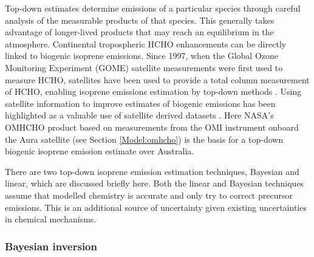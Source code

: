 \documentclass[acp, manuscript]{copernicus}
\newcommand{\parencite}{\citep}
\newcommand{\textcite}{\citet}
\begin{document}
Top-down estimates determine emissions of a particular species through careful analysis of the measurable products of that species.
This generally takes advantage of longer-lived products that may reach an equilibrium in the atmosphere.
Continental tropospheric HCHO enhancements can be directly linked to biogenic isoprene emissions.
Since 1997, when the Global Ozone Monitoring Experiment (GOME) satellite measurements were first used to measure HCHO, satellites have been used to provide a total column measurement of HCHO, enabling isoprene emissions estimation by top-down methods \parencite{Thomas1998,Palmer2001,Bauwens2016}.
Using satellite information to improve estimates of biogenic emissions has been highlighted as a valuable use of satellite derived datasets \parencite{Streets2013}.
Here NASA's OMHCHO product based on measurements from the OMI instrument onboard the Aura satellite (see Section \ref{Model:omhcho}) is the basis for a top-down biogenic isoprene emission estimate over Australia.

There are two top-down isoprene emission estimation techniques, Bayesian and linear, which are discussed briefly here.
Both the linear and Bayesian techniques assume that modelled chemistry is accurate and only try to correct precursor emissions.
This is an additional source of uncertainty given existing uncertainties in chemical mechanisms.


%    


\subsubsection{Bayesian inversion}
\end{document}
